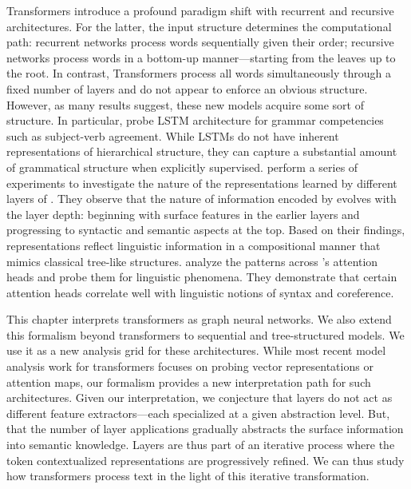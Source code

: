 Transformers introduce a profound paradigm shift with recurrent and recursive architectures. For the latter, the input structure determines the computational path: recurrent networks process words sequentially given their order; recursive networks process words in a bottom-up manner—starting from the leaves up to the root. In contrast, Transformers process all words simultaneously through a fixed number of layers and do not appear to enforce an obvious structure. However, as many results suggest, these new models acquire some sort of structure.
In particular, \textcite{linzen_16} probe LSTM architecture for grammar competencies such as subject-verb agreement. While LSTMs do not have inherent representations of hierarchical structure, they can capture a substantial amount of grammatical structure when explicitly supervised. 
\textcite{jawahar_19} perform a series of experiments to investigate the nature of the representations learned by different layers of \bert. They observe that the nature of information encoded by \bert evolves with the layer depth: beginning with surface features in the earlier layers and progressing to syntactic and semantic aspects at the top. Based on their findings, \bert representations reflect linguistic information in a compositional manner that mimics classical tree-like structures.
\textcite{clark_19} analyze the patterns across \bert’s attention heads and probe them for linguistic phenomena. They demonstrate that certain attention heads correlate well with linguistic notions of syntax and coreference.

This chapter interprets transformers as graph neural networks. We also extend this formalism beyond transformers to sequential and tree-structured models. We use it as a new analysis grid for these architectures. While most recent model analysis work for transformers focuses on probing vector representations or attention maps, our formalism provides a new interpretation path for such architectures. Given our interpretation, we conjecture that layers do not act as different feature extractors—each specialized at a given abstraction level. But, that the number of layer applications gradually abstracts the surface information into semantic knowledge. Layers are thus part of an iterative process where the token contextualized representations are progressively refined. We can thus study how transformers process text in the light of this iterative transformation.

